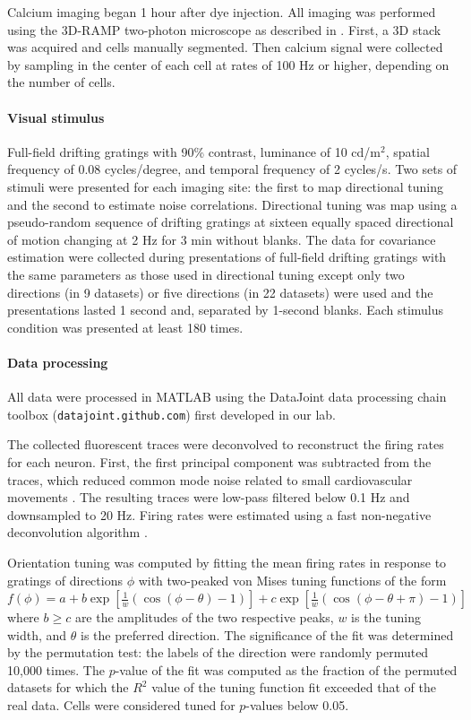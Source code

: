 \documentclass[10pt]{article}
\begin{document}
Calcium imaging began 1 hour after dye injection.  All imaging was performed using the 3D-RAMP two-photon microscope as described in \cite{Cotton:2013}. First, a 3D stack was acquired and cells manually segmented. Then calcium signal were collected by sampling in the center of each cell at rates of 100 Hz or higher, depending on the number of cells.

\paragraph{Visual stimulus}
Full-field drifting gratings with 90\% contrast, luminance of 10 cd/m$^2$, spatial frequency of 0.08 cycles/degree, and temporal frequency of 2 cycles/s. Two sets of stimuli were presented for each imaging site: the first to map directional tuning and the second to estimate noise correlations. Directional tuning was map using a pseudo-random sequence of drifting gratings at sixteen equally spaced directional of motion changing at 2 Hz for 3 min without blanks. The data for covariance estimation were collected during presentations of full-field drifting gratings with the same parameters as those used in directional tuning except only two directions (in 9 datasets) or five directions (in 22 datasets) were used and the presentations lasted 1 second and, separated by 1-second blanks.  Each stimulus condition was presented at least 180 times. 
\paragraph{Data processing}
All data were processed in MATLAB using the DataJoint data processing chain toolbox ({\tt datajoint.github.com}) first developed in our lab. 

The collected fluorescent traces were deconvolved to reconstruct the firing rates for each neuron. First, the first principal component was subtracted from the traces, which reduced common mode noise related to small cardiovascular movements \cite{Cotton:2013}. The resulting traces were low-pass filtered below 0.1 Hz and downsampled to 20 Hz. Firing rates were estimated using a fast non-negative deconvolution algorithm \cite{Vogelstein:2010}.

Orientation tuning was computed by fitting the mean firing rates in response to gratings of directions $\phi$ with two-peaked von Mises tuning functions of the form $f(\phi)=a + b\exp\left[\frac 1 w(\cos(\phi-\theta)-1) \right] + c\exp\left[\frac 1 w(\cos(\phi-\theta+\pi)-1) \right]$ where $b\ge c$ are the amplitudes of the two respective peaks, $w$ is the tuning width, and  $\theta$ is the preferred direction. The significance of the fit was determined by the permutation test: the labels of the direction were randomly permuted 10,000 times.  The $p$-value of the fit was computed as the fraction of the permuted datasets for which the $R^2$ value of the tuning function fit exceeded that of the real data.  Cells were considered tuned for $p$-values below 0.05.
\end{document}
